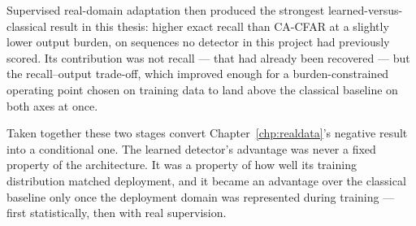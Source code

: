 Supervised real-domain adaptation then produced the strongest learned-versus-classical result in this
thesis: higher exact recall than CA-CFAR at a slightly lower output burden, on sequences no detector
in this project had previously scored. Its contribution was not recall --- that had already been
recovered --- but the recall--output trade-off, which improved enough for a burden-constrained
operating point chosen on training data to land above the classical baseline on both axes at once.

Taken together these two stages convert Chapter~\ref{chp:realdata}'s negative result into a
conditional one. The learned detector's advantage was never a fixed property of the architecture. It
was a property of how well its training distribution matched deployment, and it became an advantage
over the classical baseline only once the deployment domain was represented during training --- first
statistically, then with real supervision.
